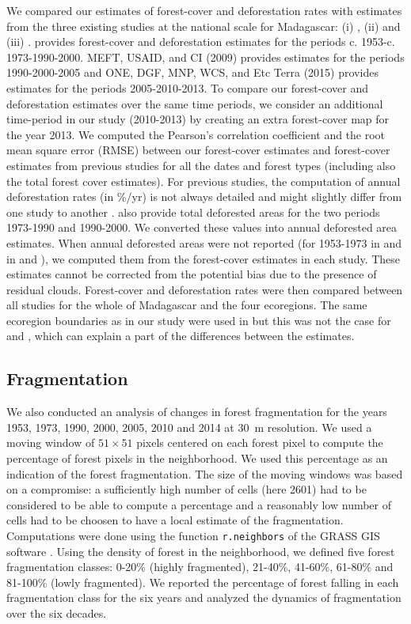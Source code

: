 \documentclass[a4paper, 12pt, leqno]{article} %
\begin{document}
We compared our estimates of forest-cover and deforestation rates with
estimates from the three existing studies at the national scale for
Madagascar: (i) \citep{Harper2007}, (ii) \citep{MEFT2009} and (iii)
\citep{ONE2015}. \citet{Harper2007} provides forest-cover and
deforestation estimates for the periods
c. 1953-c. 1973-1990-2000. MEFT, USAID, and CI (2009) provides
estimates for the periods 1990-2000-2005 and ONE, DGF, MNP, WCS, and
Etc Terra (2015) provides estimates for the periods 2005-2010-2013. To
compare our forest-cover and deforestation estimates over the same
time periods, we consider an additional time-period in our study
(2010-2013) by creating an extra forest-cover map for the year
2013. We computed the Pearson's correlation coefficient and the root
mean square error (RMSE) between our forest-cover estimates and
forest-cover estimates from previous studies for all the dates and
forest types (including also the total forest cover estimates). For
previous studies, the computation of annual deforestation rates (in
\%/yr) is not always detailed and might slightly differ from one study
to another \citep[see][]{Puyravaud2003}. \citet{Harper2007} also
provide total deforested areas for the two periods 1973-1990 and
1990-2000. We converted these values into annual deforested area
estimates. When annual deforested areas were not reported (for
1953-1973 in \citet{Harper2007} and in \citet{MEFT2009} and
\citet{ONE2015}), we computed them from the forest-cover estimates in
each study. These estimates cannot be corrected from the potential
bias due to the presence of residual clouds. Forest-cover and
deforestation rates were then compared between all studies for the
whole of Madagascar and the four ecoregions. The same ecoregion
boundaries as in our study were used in \citet{ONE2015} but this was
not the case for \citet{Harper2007} and \citet{MEFT2009}, which can
explain a part of the differences between the estimates.

\subsection{Fragmentation}

We also conducted an analysis of changes in forest fragmentation for
the years 1953, 1973, 1990, 2000, 2005, 2010 and 2014 at 30~m
resolution. We used a moving window of $51 \times 51$ pixels centered
on each forest pixel to compute the percentage of forest pixels in the
neighborhood. We used this percentage as an indication of the forest
fragmentation. The size of the moving windows was based on a
compromise: a sufficiently high number of cells (here 2601) had to be
considered to be able to compute a percentage and a reasonably low
number of cells had to be choosen to have a local estimate of the
fragmentation. Computations were done using the function
\texttt{r.neighbors} of the GRASS GIS software
\citep{Neteler2008}. Using the density of forest in the neighborhood,
we defined five forest fragmentation classes: 0-20\% (highly
fragmented), 21-40\%, 41-60\%, 61-80\% and 81-100\% (lowly
fragmented). We reported the percentage of forest falling in each
fragmentation class for the six years and analyzed the dynamics of
fragmentation over the six decades.
\end{document}
